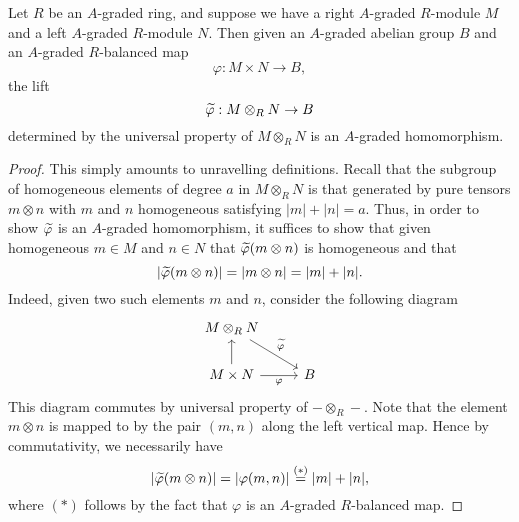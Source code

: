 \documentclass[../main.tex]{subfiles}
\begin{document}
\begin{lemma}\label{tensor_lift_of_A_graded_is_A_graded}
	Let $R$ be an $A$-graded ring, and suppose we have a right $A$-graded $R$-module $M$ and a left $A$-graded $R$-module $N$. Then given an $A$-graded abelian group $B$ and an $A$-graded $R$-balanced map
	\[\varphi:M\times N\to B,\]
	the lift
	\[\widetilde\varphi:M\otimes_RN\to B\]
	determined by the universal property of $M\otimes_RN$ is an $A$-graded homomorphism.
\end{lemma}
\begin{proof}
	This simply amounts to unravelling definitions. Recall that the subgroup of homogeneous elements of degree $a$ in $M\otimes_RN$ is that generated by pure tensors $m\otimes n$ with $m$ and $n$ homogeneous satisfying $|m|+|n|=a$. Thus, in order to show $\widetilde\varphi$ is an $A$-graded homomorphism, it suffices to show that given homogeneous $m\in M$ and $n\in N$ that $\widetilde\varphi(m\otimes n)$ is homogeneous and that
	\[|\widetilde\varphi(m\otimes n)|=|m\otimes n|=|m|+|n|.\]
	Indeed, given two such elements $m$ and $n$, consider the following diagram
	\[\begin{tikzcd}
		{M\otimes_RN} \\
		{M\times N} & B
		\arrow[from=2-1, to=1-1]
		\arrow["\wt\varphi", from=1-1, to=2-2]
		\arrow["\varphi"', from=2-1, to=2-2]
	\end{tikzcd}\]
	This diagram commutes by universal property of $-\otimes_R-$. Note that the element $m\otimes n$ is mapped to by the pair $(m,n)$ along the left vertical map. Hence by commutativity, we necessarily have
	\[|\widetilde\varphi(m\otimes n)|=|\varphi(m,n)|\overset{(*)}=|m|+|n|,\]
	where $(*)$ follows by the fact that $\varphi$ is an $A$-graded $R$-balanced map.
\end{proof}
\end{document}
